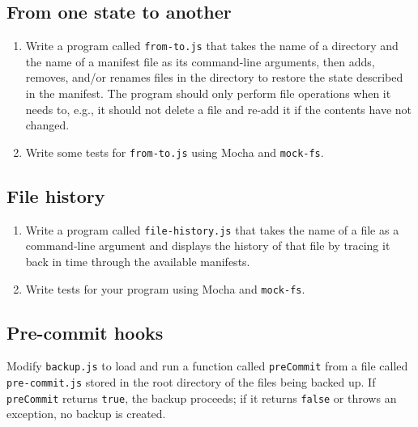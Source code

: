 \documentclass[krantzl]{krantz}
\begin{document}
\subsection*{From one state to another}

\begin{enumerate}

\item 

Write a program called \texttt{from-to.js} that takes the name of a directory
    and the name of a manifest file
    as its command-line arguments,
    then adds, removes, and/or renames files in the directory
    to restore the state described in the manifest.
    The program should only perform file operations when it needs to,
    e.g.,
    it should not delete a file and re-add it if the contents have not changed.



\item 

Write some tests for \texttt{from-to.js} using Mocha and \texttt{mock-fs}.



\end{enumerate}

\subsection*{File history}

\begin{enumerate}

\item 

Write a program called \texttt{file-history.js}
    that takes the name of a file as a command-line argument
    and displays the history of that file
    by tracing it back in time through the available manifests.



\item 

Write tests for your program using Mocha and \texttt{mock-fs}.



\end{enumerate}

\subsection*{Pre-commit hooks}


Modify \texttt{backup.js} to load and run a function called \texttt{preCommit} from a file called \texttt{pre-commit.js}
stored in the root directory of the files being backed up.
If \texttt{preCommit} returns \texttt{true}, the backup proceeds;
if it returns \texttt{false} or throws an exception,
no backup is created.
\end{document}
